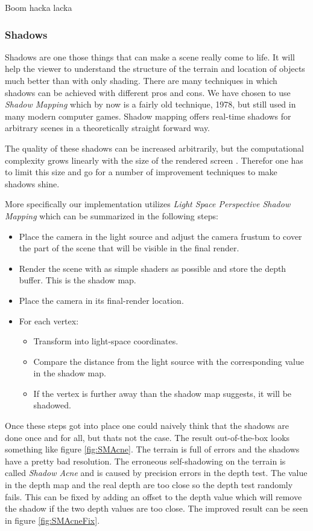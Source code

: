 Boom hacka lacka

\subsubsection{Shadows}
Shadows are one those things that can make a scene really come to life. It will help the viewer to understand the structure of the terrain and location of objects much better than with only shading. There are many techniques in which shadows can be achieved with different pros and cons. We have chosen to use \textit{Shadow Mapping} \cite{ShadowMapping} which by now is a fairly old technique, 1978, but still used in many modern computer games. Shadow mapping offers real-time shadows for arbitrary scenes in a theoretically straight forward way. 

The quality of these shadows can be increased arbitrarily, but the computational complexity grows linearly with the size of the rendered screen \cite{ShadowMapping}. Therefor one has to limit this size and go for a number of improvement techniques to make shadows shine. 

More specifically our implementation utilizes \textit{Light Space Perspective Shadow Mapping} \cite{LSPShadowMapping} which can be summarized in the following steps:

\begin{itemize}
\item Place the camera in the light source and adjust the camera frustum to cover the part of the scene that will be visible in the final render.
\item Render the scene with as simple shaders as possible and store the depth buffer. This is the shadow map.
\item Place the camera in its final-render location.
\item For each vertex:
\begin{itemize}
\item Transform into light-space coordinates.
\item Compare the distance from the light source with the corresponding value in the shadow map.
\item If the vertex is further away than the shadow map suggests, it will be shadowed. 
\end{itemize}
\end{itemize}

Once these steps got into place one could naively think that the shadows are done once and for all, but thats not the case. The result out-of-the-box looks something like figure \ref{fig:SMAcne}. The terrain is full of errors and the shadows have a pretty bad resolution. The erroneous self-shadowing on the terrain is called \textit{Shadow Acne} \cite{ImprovedShadowMapping} and is caused by precision errors in the depth test. The value in the depth map and the real depth are too close so the depth test randomly fails. This can be fixed by adding an offset to the depth value which will remove the shadow if the two depth values are too close. The improved result can be seen in figure \ref{fig:SMAcneFix}.

